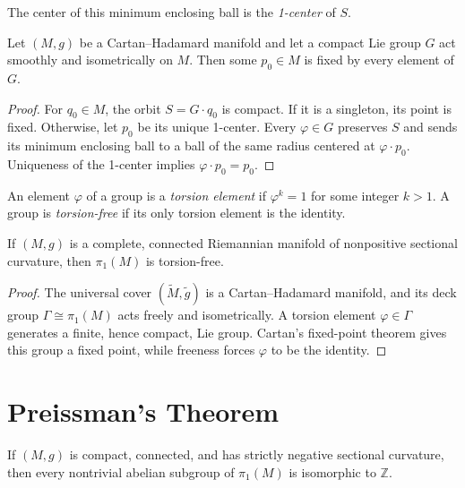 The center of this minimum enclosing ball is the \emph{1-center} of $S$.

\begin{theorem}
\label{thm:cartans-fixed-point}
Let $(M,g)$ be a Cartan--Hadamard manifold and let a compact Lie group $G$
act smoothly and isometrically on $M$.  Then some $p_0\in M$ is fixed by
every element of $G$.
\begin{proof}
\sketch For $q_0\in M$, the orbit $S=G\cdot q_0$ is compact.  If it is a
singleton, its point is fixed.  Otherwise, let $p_0$ be its unique 1-center.
Every $\varphi\in G$ preserves $S$ and sends its minimum enclosing ball to a
ball of the same radius centered at $\varphi\cdot p_0$.  Uniqueness of the
1-center implies $\varphi\cdot p_0=p_0$.
\end{proof}
\end{theorem}

An element $\varphi$ of a group is a \emph{torsion element} if
$\varphi^k=1$ for some integer $k>1$.  A group is \emph{torsion-free} if its
only torsion element is the identity.

\begin{corollary}
\label{cor:cartans-torsion-theorem}
If $(M,g)$ is a complete, connected Riemannian manifold of nonpositive
sectional curvature, then $\pi_1(M)$ is torsion-free.
\begin{proof}
\sketch The universal cover $(\widetilde M,\widetilde g)$ is a
Cartan--Hadamard manifold, and its deck group
$\Gamma\cong\pi_1(M)$ acts freely and isometrically.  A torsion element
$\varphi\in\Gamma$ generates a finite, hence compact, Lie group.  Cartan's
fixed-point theorem gives this group a fixed point, while freeness forces
$\varphi$ to be the identity.
\end{proof}
\end{corollary}
\section{Preissman's Theorem}

\begin{theorem}[Preissman]
\label{thm:preissman-theorem}
If $(M,g)$ is compact, connected, and has strictly negative sectional
curvature, then every nontrivial abelian subgroup of $\pi_1(M)$ is isomorphic
to $\mathbb Z$.
\end{theorem}

